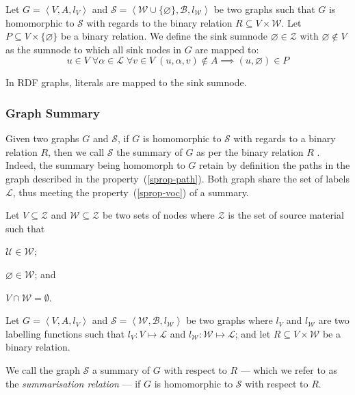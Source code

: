 \begin{definition}
Let $G=\left\langle V, A, l_V \right\rangle$ and $\mathcal{S}=\left\langle \mathcal{W} \cup \{ \varnothing \}, \mathcal{B}, l_\mathcal{W} \right\rangle$ be two graphs such that $G$ is homomorphic to $\mathcal{S}$ with regards to the binary relation $R \subseteq V \times \mathcal{W}$.
Let $P \subseteq V \times \{ \varnothing \}$ be a binary relation.
We define the sink sumnode $\varnothing \in \mathcal{Z}$ with $\varnothing \not \in V$ as the sumnode to which all sink nodes in $G$ are mapped to:
$$
u \in V\; \forall \alpha \in \mathcal{L}\; \forall v \in V\; (u, \alpha, v) \not \in A \implies (u, \varnothing) \in P
$$
\label{def:sink-sumnode}
\end{definition}

\begin{remark}
	In RDF graphs, literals are mapped to the sink sumnode.
\end{remark}

\subsubsection{Graph Summary}

Given two graphs $G$ and $\mathcal{S}$, if $G$ is homomorphic to $\mathcal{S}$ with regards to a binary relation $R$, then we call $\mathcal{S}$ the summary of $G$ as per the binary relation $R$ \cite{campinas:2012:dexa}. Indeed, the summary being homomorph to $G$ retain by definition the paths in the graph described in the property~(\ref{sprop-path}). Both graph share the set of labels $\mathcal{L}$, thus meeting the property~(\ref{sprop-voc}) of a summary.

\begin{definition}
Let $V \subseteq \mathcal{Z}$ and $\mathcal{W} \subseteq \mathcal{Z}$ be two sets of nodes where $\mathcal{Z}$ is the set of source material such that
\begin{inparaenum}[(a)]
	\item $\mathcal{U} \in \mathcal{W}$;
	\item $\varnothing \in \mathcal{W}$; and
	\item $V \cap \mathcal{W} = \emptyset$.
\end{inparaenum}

Let $G=\left\langle V, A, l_V \right\rangle$ and $\mathcal{S}=\left\langle \mathcal{W}, \mathcal{B}, l_\mathcal{W} \right\rangle$ be two graphs where $l_V$ and $l_\mathcal{W}$ are two labelling functions such that $l_V : V \mapsto \mathcal{L}$ and $l_\mathcal{W} : \mathcal{W} \mapsto \mathcal{L}$; and let $R \subseteq V \times \mathcal{W}$ be a binary relation.

We call the graph $\mathcal{S}$ a summary of $G$ with respect to $R$ --- which we refer to as the \emph{summarisation relation} --- if $G$ is homomorphic to $\mathcal{S}$ with respect to $R$.
\end{definition}

